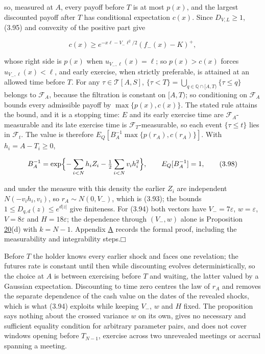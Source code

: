 \documentclass[11pt]{article}
\providecommand{\square}{\mdlgwhtsquare}
\begin{document}
so, measured at \(A\), every payoff before \(T\) is at most \(p(x)\), and the largest discounted payoff after \(T\) has conditional expectation \(c(x)\). Since \(D_{V,L} \ge 1\), (3.95) and convexity of the positive part give

\begin{equation*}
c(x) \ge e^{-x\ell - V_- \ell^2 / 2} (f_-(x) - K)^+, \tag{3.97}\label{eq:3.97}
\end{equation*}

whose right side is \(p(x)\) when \(u_{V_-, \ell}(x) = \ell\); so \(p(x) > c(x)\) forces \(u_{V_-, \ell}(x) < \ell\), and early exercise, when strictly preferable, is attained at an allowed time before \(T\). For any \(\tau \in \mathcal T[A, S]\), \(\{\tau < T\} = \bigcup_{q \in \mathbb Q \cap [A, T)} \{\tau \le q\}\) belongs to \(\mathcal F_A\), because the filtration is constant on \([A, T)\); so conditioning on \(\mathcal F_A\) bounds every admissible payoff by \(\max\{p(x), c(x)\}\). The stated rule attains the bound, and it is a stopping time: \(E\) and its early exercise time are \(\mathcal F_A\)-measurable and its late exercise time is \(\mathcal F_T\)-measurable, so each event \(\{\tau \le t\}\) lies in \(\mathcal F_t\). The value is therefore \(E_Q[B_A^{-1} \max\{p(r_A), c(r_A)\}]\). With \(h_i = A - T_i \ge 0\),

\begin{equation*}
B_A^{-1} = \exp\Bigl\{ -\sum_{i < N} h_i Z_i - \tfrac12 \sum_{i < N} v_i h_i^2 \Bigr\}, \qquad E_Q[B_A^{-1}] = 1, \tag{3.98}\label{eq:3.98}
\end{equation*}

and under the measure with this density the earlier \(Z_i\) are independent \(N(-v_i h_i, v_i)\), so \(r_A \sim N(0, V_-)\), which is (3.93); the bounds \(1 \le D_{q,d}(z) \le e^{d|z|}\) give finiteness. For (3.94) both vectors have \(V_- = 7\varepsilon\), \(w = \varepsilon\), \(V = 8\varepsilon\) and \(H = 18\varepsilon\); the dependence through \((V_-, w)\) alone is Proposition \hyperref[res:Proposition-20]{20}(d) with \(k = N - 1\). Appendix \hyperref[sec:A]{A} records the formal proof, including the measurability and integrability steps.\hfill$\square$

Before \(T\) the holder knows every earlier shock and faces one revelation; the futures rate is constant until then while discounting evolves deterministically, so the choice at \(A\) is between exercising before \(T\) and waiting, the latter valued by a Gaussian expectation. Discounting to time zero centres the law of \(r_A\) and removes the separate dependence of the cash value on the dates of the revealed shocks, which is what (3.94) exploits while keeping \(V_-\), \(w\) and \(H\) fixed. The proposition says nothing about the crossed variance \(w\) on its own, gives no necessary and sufficient equality condition for arbitrary parameter pairs, and does not cover windows opening before \(T_{N-1}\), exercise across two unrevealed meetings or accrual spanning a meeting.
\end{document}
